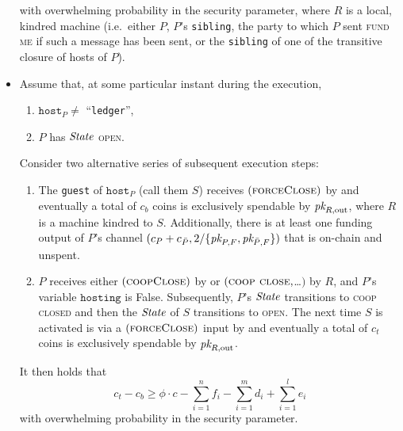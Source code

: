 \begin{lemma}
\begin{itemize}
    with overwhelming probability in the security parameter, where $R$ is a
    local, kindred machine (i.e.\ either $P$, $P$'s \texttt{sibling}, the party
    to which $P$ sent \textsc{fund me} if such a message has been sent, or the
    \texttt{sibling} of one of the transitive closure of hosts of $P$).
    \item Assume that, at some particular instant during the execution,
    \begin{enumerate}
      \item $\texttt{host}_P \neq$ ``\texttt{ledger}'',
      \item $P$ has $\itistate$ \textsc{open}.
    \end{enumerate}
    Consider two alternative series of subsequent execution steps:
    \begin{enumerate}
      \item The \texttt{guest} of $\texttt{host}_P$ (call them $S$) receives
      $(\textsc{forceClose})$ by \environment and eventually a total of $c_b$
      coins is exclusively spendable by $\textit{pk}_{R, \mathrm{out}}$, where $R$ is a
      machine kindred to $S$. Additionally, there is at least one funding output
      of $P$'s channel $(c_P + c_{\bar{P}}, 2/\{\textit{pk}_{P, F}, \textit{pk}_{\bar{P}, F}\})$
      that is on-chain and unspent.
      \item $P$ receives either $(\textsc{coopClose})$ by \environment or
      $(\textsc{coop close}, $\dots$)$ by $R$, and $P$'s variable
      $\texttt{hosting}$ is False. Subsequently, $P$'s $\itistate$ transitions
      to \textsc{coop closed} and then the $\itistate$ of $S$ transitions to
      \textsc{open}. The next time $S$ is activated is via a
      $(\textsc{forceClose})$ input by \environment and eventually a total of
      $c_t$ coins is exclusively spendable by $\textit{pk}_{R, \mathrm{out}}$.
    \end{enumerate}
    It then holds that
    \begin{equation}
      c_t - c_b \geq \phi \cdot c - \sum\limits_{i=1}^n f_i -
      \sum\limits_{i=1}^m d_i + \sum\limits_{i=1}^l e_i
    \end{equation}
    with overwhelming probability in the security parameter.
  \end{itemize}
\end{lemma}

